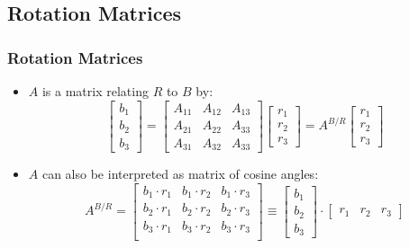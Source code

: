 \documentclass[11pt]{beamer}
\begin{document}
    \subsection{Rotation Matrices}\label{subsec:rotationMatrices}
    \begin{frame}
        \frametitle{Rotation Matrices}
        \begin{itemize}
            \item $A$ is a matrix relating $R$ to $B$ by: \pause
            \begin{equation}
                \begin{bmatrix}
                    b_1 \\
                    b_2 \\
                    b_3
                \end{bmatrix}
                =
                \begin{bmatrix}
                    A_{11} & A_{12} & A_{13} \\
                    A_{21} & A_{22} & A_{33} \\
                    A_{31} & A_{32} & A_{33}
                \end{bmatrix}
                \begin{bmatrix}
                    r_1 \\
                    r_2 \\
                    r_3
                \end{bmatrix}
                = A^{B/R}
                \begin{bmatrix}
                    r_1 \\
                    r_2 \\
                    r_3
                \end{bmatrix}
            \end{equation} \medskip \pause
            \item $A$ can also be interpreted as matrix of cosine angles:
            \begin{equation}
                A^{B/R} =
                \begin{bmatrix}
                    b_1 \cdot r_1 & b_1 \cdot r_2 & b_1 \cdot r_3 \\
                    b_2 \cdot r_1 & b_2 \cdot r_2 & b_2 \cdot r_3 \\
                    b_3 \cdot r_1 & b_3 \cdot r_2 & b_3 \cdot r_3 \\
                \end{bmatrix}
                \equiv
                \begin{bmatrix}
                    b_1 \\
                    b_2 \\
                    b_3
                \end{bmatrix}
                \cdot
                \begin{bmatrix}
                    r_1 & r_2 & r_3
                \end{bmatrix}
            \end{equation}
        \end{itemize}
    \end{frame}
\end{document}
